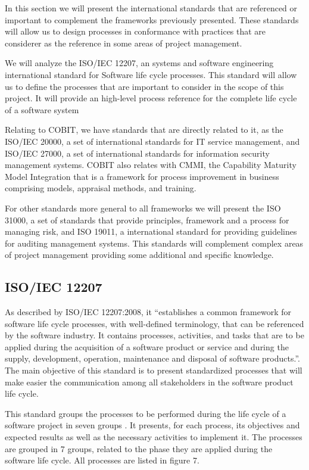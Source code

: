 In this section we will present the international standards that are referenced or important to complement the frameworks previously presented. These standards will allow us to design processes in conformance with practices that are considerer as the reference in some areas of project management.\par
We will analyze the ISO/IEC 12207\cite{ISO12207}, an systems and software engineering international standard for Software life cycle processes. This standard will allow us to define the processes that are important to consider in the scope of this project. It will provide an high-level process reference for the complete life cycle of a software system\par
Relating to COBIT, we have standards that are directly related to it, as the ISO/IEC 20000\cite{ISO20000-1,ISO20000-2,ISO20000-3,ISO20000-4,ISO20000-5}, a set of international standards for IT service management, and ISO/IEC 27000\cite{ISO27000}, a set of international standards for information security management systems. COBIT also relates with CMMI\cite{cmmi}, the Capability Maturity Model Integration that is a framework for process improvement in business comprising models, appraisal methods, and training.\par
For other standards more general to all frameworks we will present the ISO 31000\cite{ISO31000,IEC31010}, a set of standards that provide principles, framework and a process for managing risk, and ISO 19011, a international standard for providing guidelines for auditing management systems. This standards will complement complex areas of project management providing some additional and specific knowledge.

\subsection{ISO/IEC 12207}

As described by ISO/IEC 12207:2008, it ``establishes a common framework for software life cycle processes, with well-defined terminology, that can be referenced by the software industry. It contains processes, activities, and tasks that are to be applied during the acquisition of a software product or service and during the supply, development, operation, maintenance and disposal of software products.''.\cite{ISO12207} The main objective of this standard is to present standardized processes that will make easier the communication among all stakeholders in the software product life cycle.\par
This standard groups the processes to be performed during the life cycle of a software project in seven groups . It presents, for each process, its objectives and expected results as well as the necessary activities to implement it. The processes are grouped in 7 groups, related to the phase they are applied during the software life cycle. All processes are listed in figure 7.

